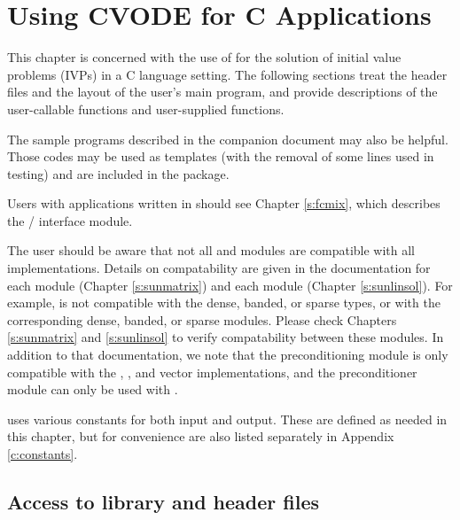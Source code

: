 \chapter{Using CVODE for C Applications}\label{s:simulation}

This chapter is concerned with the use of {\cvode} for the solution of
initial value problems (IVPs) in a C language setting.  The following
sections treat the header files and the layout of the user's main
program, and provide descriptions of the {\cvode} user-callable
functions and user-supplied functions.

The sample programs described in the companion document \cite{cvode_ex} 
may also be helpful.  Those codes may be used as templates (with the removal
of some lines used in testing) and are included in the {\cvode} package.

Users with applications written in {\F} should see Chapter \ref{s:fcmix},
which describes the {\F}/{\CC} interface module.

The user should be aware that not all {\sunlinsol} and {\sunmatrix}
modules are compatible with all {\nvector} implementations. 
Details on compatability are given in the documentation for each
{\sunmatrix} module (Chapter \ref{s:sunmatrix}) and each {\sunlinsol}
module (Chapter \ref{s:sunlinsol}). For example, {\nvecp} is not
compatible with the dense, banded, or sparse {\sunmatrix} types, or with
the corresponding dense, banded, or sparse {\sunlinsol} modules.  Please
check Chapters \ref{s:sunmatrix} and \ref{s:sunlinsol} to verify
compatability between these modules.  In addition to that
documentation, we note that the {\cvbandpre} preconditioning module is
only compatible with the {\nvecs}, {\nvecopenmp}, and {\nvecpthreads}
vector implementations, and the preconditioner module {\cvbbdpre}
can only be used with {\nvecp}.

{\cvode} uses various constants for both input and output.  These are
defined as needed in this chapter, but for convenience are also listed
separately in Appendix \ref{c:constants}.

\section{Access to library and header files}\label{ss:file_access}

